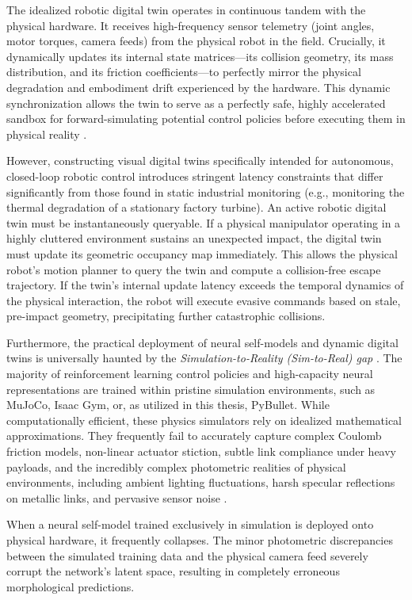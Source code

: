 \documentclass[12pt,a4paper,oneside]{report}
\begin{document}
The idealized robotic digital twin operates in continuous tandem with the physical hardware. It receives high-frequency sensor telemetry (joint angles, motor torques, camera feeds) from the physical robot in the field. Crucially, it dynamically updates its internal state matrices—its collision geometry, its mass distribution, and its friction coefficients—to perfectly mirror the physical degradation and embodiment drift experienced by the hardware. This dynamic synchronization allows the twin to serve as a perfectly safe, highly accelerated sandbox for forward-simulating potential control policies before executing them in physical reality \cite{sun2026digitaltwin, murugesan2024digitaltwin}.

However, constructing visual digital twins specifically intended for autonomous, closed-loop robotic control introduces stringent latency constraints that differ significantly from those found in static industrial monitoring (e.g., monitoring the thermal degradation of a stationary factory turbine). An active robotic digital twin must be instantaneously queryable. If a physical manipulator operating in a highly cluttered environment sustains an unexpected impact, the digital twin must update its geometric occupancy map immediately. This allows the physical robot's motion planner to query the twin and compute a collision-free escape trajectory. If the twin's internal update latency exceeds the temporal dynamics of the physical interaction, the robot will execute evasive commands based on stale, pre-impact geometry, precipitating further catastrophic collisions.

Furthermore, the practical deployment of neural self-models and dynamic digital twins is universally haunted by the \textit{Simulation-to-Reality (Sim-to-Real) gap} \cite{tan2018simtoreal}. The majority of reinforcement learning control policies and high-capacity neural representations are trained within pristine simulation environments, such as MuJoCo, Isaac Gym, or, as utilized in this thesis, PyBullet. While computationally efficient, these physics simulators rely on idealized mathematical approximations. They frequently fail to accurately capture complex Coulomb friction models, non-linear actuator stiction, subtle link compliance under heavy payloads, and the incredibly complex photometric realities of physical environments, including ambient lighting fluctuations, harsh specular reflections on metallic links, and pervasive sensor noise \cite{aljalbout2026realitygap}.

When a neural self-model trained exclusively in simulation is deployed onto physical hardware, it frequently collapses. The minor photometric discrepancies between the simulated training data and the physical camera feed severely corrupt the network's latent space, resulting in completely erroneous morphological predictions. 
\end{document}
